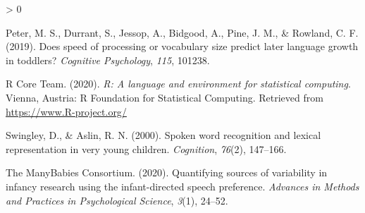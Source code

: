 \documentclass[
  english,
  man,floatsintext]{apa6}
\newlength{\cslhangindent}
\newenvironment{CSLReferences}[2] %
 {%
  \setlength{\parindent}{0pt}
  \ifodd #1 \everypar{\setlength{\hangindent}{\cslhangindent}}\ignorespaces\fi
  \ifnum #2 > 0
  \setlength{\parskip}{#2\baselineskip}
  \fi
 }%
 {}
\begin{document}
\begin{CSLReferences}{1}{0}
\leavevmode\hypertarget{ref-peter2019}{}%
Peter, M. S., Durrant, S., Jessop, A., Bidgood, A., Pine, J. M., \& Rowland, C. F. (2019). Does speed of processing or vocabulary size predict later language growth in toddlers? \emph{Cognitive Psychology}, \emph{115}, 101238.

\leavevmode\hypertarget{ref-R-base}{}%
R Core Team. (2020). \emph{R: A language and environment for statistical computing}. Vienna, Austria: R Foundation for Statistical Computing. Retrieved from \url{https://www.R-project.org/}

\leavevmode\hypertarget{ref-swingley2000}{}%
Swingley, D., \& Aslin, R. N. (2000). {Spoken word recognition and lexical representation in very young children.} \emph{Cognition}, \emph{76}(2), 147--166.

\leavevmode\hypertarget{ref-manybabies2020}{}%
The ManyBabies Consortium. (2020). {Quantifying sources of variability in infancy research using the infant-directed speech preference}. \emph{Advances in Methods and Practices in Psychological Science}, \emph{3}(1), 24--52.

\end{CSLReferences}

\endgroup
\end{document}
